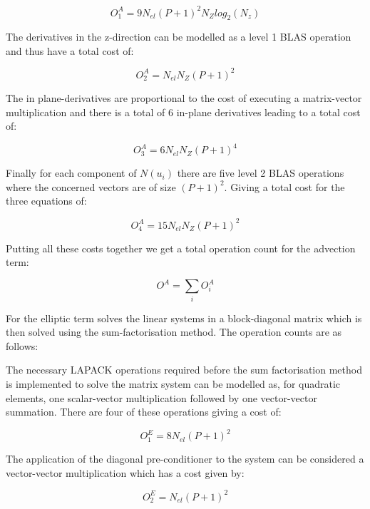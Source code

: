 \begin{equation}
O^A_1 = 9 N_{el}(P+1)^2N_Z log_2(N_z)
\end{equation}

The derivatives in the z-direction can be modelled as a level 1 BLAS operation and thus have a total cost of:

\begin{equation}
O^A_2 =N_{el}N_Z (P+1)^2
\end{equation}

The in plane-derivatives are proportional to the cost of executing a matrix-vector multiplication and there is a total of 6 in-plane derivatives leading to a total cost of:

\begin{equation}
O^A_3 = 6 N_{el}N_Z(P+1)^4
\end{equation}

Finally for each component of \(N(u_i)\) there are five level 2 BLAS operations where the concerned vectors are of size \((P+1)^2\). Giving a total cost for the three equations of:

\begin{equation}
O^A_4 = 15N_{el}N_Z(P+1)^2
\end{equation}

Putting all these costs together we get a total operation count for the advection term:

\begin{equation}
O^A = \sum_i O^A_i
\end{equation}

For the elliptic term  solves the linear systems in a block-diagonal matrix which is then solved using the sum-factorisation method. The operation counts are as follows:

The necessary  LAPACK operations required before the sum factorisation method is implemented to solve the matrix system can be modelled as, for quadratic elements, one scalar-vector multiplication followed by one vector-vector summation. There are four of these  operations giving a cost of:

\begin{equation}
O^E_1 = 8N_{el}(P+1)^2
\end{equation}

The application of the diagonal pre-conditioner to the system can be considered a vector-vector multiplication which has a cost given by:

\begin{equation}
O^E_2 = N_{el}(P+1)^2
\end{equation}

